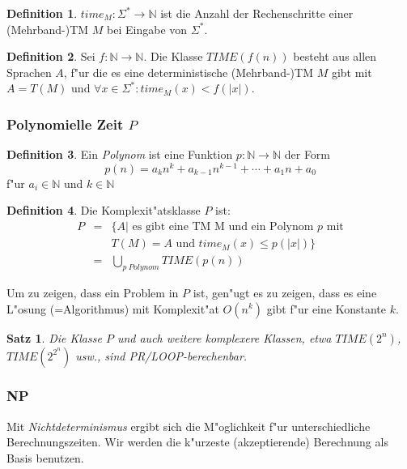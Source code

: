\documentclass[german, 10pt, a4paper, twocolumn]{scrartcl}
\newtheorem{satz}{Satz}[section]
\theoremstyle{definition}
\newtheorem*{definition}{Definition}
\theoremstyle{example}
\begin{document}
\begin{definition}
	$time_M : \Sigma^* \to \mathbb{N}$ ist die Anzahl der Rechenschritte einer (Mehrband-)TM $M$ bei Eingabe von $\Sigma^*$.
\end{definition}

\begin{definition}
	Sei $f: \mathbb{N}\to \mathbb{N}$. Die Klasse $TIME(f(n))$ besteht aus allen Sprachen $A$, f"ur die es eine deterministische (Mehrband-)TM $M$ gibt mit $A=T(M)$ und $\forall x \in \Sigma^*: time_M(x) < f(|x|)$.
\end{definition}

\subsubsection{Polynomielle Zeit $P$}

\begin{definition}
	Ein \textit{Polynom} ist eine Funktion $p: \mathbb{N} \to \mathbb{N}$ der Form
	\begin{displaymath}
		p(n) = a_k n^k + a_{k-1}n^{k-1}+\cdots + a_1 n + a_0
	\end{displaymath}
	f"ur $a_i \in \mathbb{N}$ und $k\in \mathbb{N}$
\end{definition}

\begin{definition}
	Die Komplexit"atsklasse $P$ ist:
	\begin{eqnarray*}
		P &	= &	\{ A | \text{ es gibt eine TM M und ein Polynom } p \text{ mit}\\
		&	&	T(M) = A \text{ und } time_M(x) \leq p(|x|)\}\\
		&	= &	\bigcup_{p \ Polynom} TIME(p(n))
	\end{eqnarray*}
\end{definition}

Um zu zeigen, dass ein Problem in $P$ ist, gen"ugt es zu zeigen, dass es eine L"osung (=Algorithmus) mit Komplexit"at $O(n^k)$ gibt f"ur eine Konstante $k$.

\begin{satz}
	Die Klasse $P$ und auch weitere komplexere Klassen, etwa $TIME(2^n)$, $TIME(2^{2^n})$ usw., sind PR/LOOP-berechenbar.
\end{satz}

\subsubsection{NP}

Mit \textit{Nichtdeterminismus} ergibt sich die M"oglichkeit f"ur unterschiedliche Berechnungszeiten. Wir werden die k"urzeste (akzeptierende) Berechnung als Basis benutzen.
\end{document}
